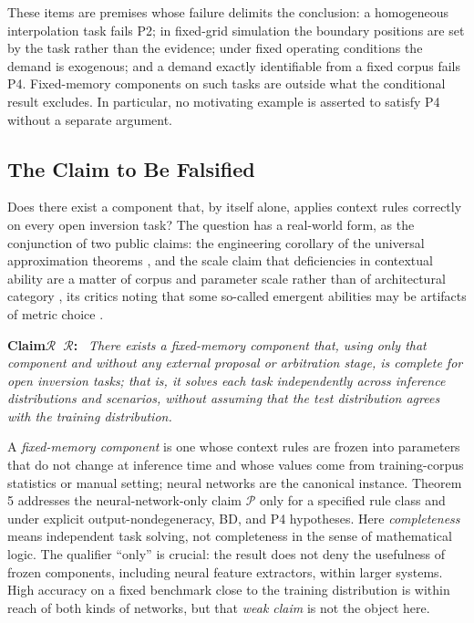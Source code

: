 \documentclass[twoside,11pt]{article}
\newenvironment{claim}[1][]{\par\medskip\noindent\textbf{Claim\ifx\relax#1\relax\else\ #1\fi:}\ \itshape}{\par\medskip}
\begin{document}
These items are premises whose failure delimits the conclusion: a homogeneous interpolation task fails P2; in fixed-grid simulation the boundary positions are set by the task rather than the evidence; under fixed operating conditions the demand is exogenous; and a demand exactly identifiable from a fixed corpus fails P4. Fixed-memory components on such tasks are outside what the conditional result excludes. In particular, no motivating example is asserted to satisfy P4 without a separate argument.

\subsection{The Claim to Be Falsified}

Does there exist a component that, by itself alone, applies context rules correctly on every open inversion task? The question has a real-world form, as the conjunction of two public claims: the engineering corollary of the universal approximation theorems \citep{cybenko1989,hornik1989}, and the scale claim that deficiencies in contextual ability are a matter of corpus and parameter scale rather than of architectural category \citep{bubeck2023}, its critics noting that some so-called emergent abilities may be artifacts of metric choice \citep{schaeffer2023}.

\begin{claim}[$\mathcal{R}$]
There exists a fixed-memory component that, using only that component and without any external proposal or arbitration stage, is complete for open inversion tasks; that is, it solves each task independently across inference distributions and scenarios, without assuming that the test distribution agrees with the training distribution.
\end{claim}

A \emph{fixed-memory component} is one whose context rules are frozen into parameters that do not change at inference time and whose values come from training-corpus statistics or manual setting; neural networks are the canonical instance. Theorem 5 addresses the neural-network-only claim $\mathcal{P}$ only for a specified rule class and under explicit output-nondegeneracy, BD, and P4 hypotheses. Here \emph{completeness} means independent task solving, not completeness in the sense of mathematical logic. The qualifier ``only'' is crucial: the result does not deny the usefulness of frozen components, including neural feature extractors, within larger systems. High accuracy on a fixed benchmark close to the training distribution is within reach of both kinds of networks, but that \emph{weak claim} is not the object here.
\end{document}
